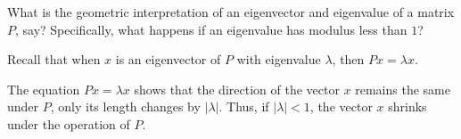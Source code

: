 \begin{exercise}
What is the geometric interpretation of an eigenvector and eigenvalue of a matrix $P$, say? Specifically, what happens if an eigenvalue has modulus less than $1$?
\begin{hint}
  Recall that when $x$ is an eigenvector of $P$ with eigenvalue $\lambda$, then $Px = \lambda x$. 
\end{hint}
\begin{solution}
The  equation $Px = \lambda x$ shows that the direction of the vector $x$ remains the same under $P$, only its length changes by $|\lambda|$.  Thus, if $|\lambda|<1$, the vector $x$ shrinks under the operation of $P$. 




\end{solution}
\end{exercise}
